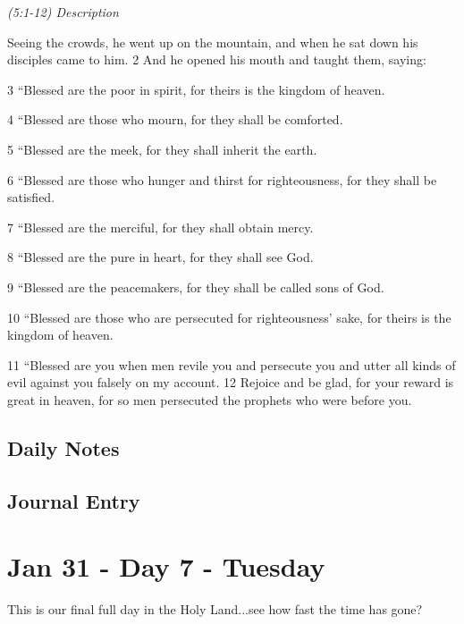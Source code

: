 \documentclass[letterpaper]{report}
\begin{document}
{\centering
	\emph{(5:1-12) Description}\\
}
\begin{multicols}{2}
Seeing the crowds, he went up on the mountain, and when he sat down his disciples came to him. 2 And he opened his mouth and taught them, saying:

3 “Blessed are the poor in spirit, for theirs is the kingdom of heaven.

4 “Blessed are those who mourn, for they shall be comforted.

5 “Blessed are the meek, for they shall inherit the earth.

6 “Blessed are those who hunger and thirst for righteousness, for they shall be satisfied.

7 “Blessed are the merciful, for they shall obtain mercy.

8 “Blessed are the pure in heart, for they shall see God.

9 “Blessed are the peacemakers, for they shall be called sons of God.

10 “Blessed are those who are persecuted for righteousness’ sake, for theirs is the kingdom of heaven.

11 “Blessed are you when men revile you and persecute you and utter all kinds of evil against you falsely on my account. 12 Rejoice and be glad, for your reward is great in heaven, for so men persecuted the prophets who were before you.
\end{multicols}

\clearpage
\subsection{Daily Notes}

\clearpage
\subsection{Journal Entry}

\clearpage
\section{Jan 31 - Day 7 - Tuesday}
This is our final full day in the Holy Land...see how fast the time has gone?
\end{document}
